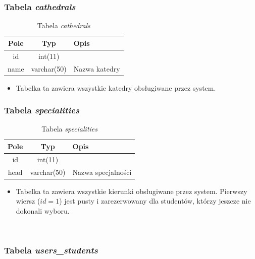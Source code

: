 \documentclass[a4paper,12pt,oneside]{report}
\begin{document}
\subsubsection{Tabela \emph{cathedrals}}
\label{subsub:cathedrals}

\begin{table}[h]
  \centering
  \begin{tabular}{|c|c|l|}\hline
  Pole & Typ & Opis \\\hline
  id              & int(11)      & \\
  name & varchar(50) & Nazwa katedry \\\hline
  \end{tabular}
  \caption{Tabela \emph{cathedrals}\label{tab:cathedrals}}
\end{table}

\begin{itemize}
  \item Tabelka ta zawiera wszystkie katedry obsługiwane przez system.
\end{itemize}

\subsubsection{Tabela \emph{specialities}}
\label{subsub:specialities}

\begin{table}[h]
  \centering
  \begin{tabular}{|c|c|l|}\hline
  Pole & Typ & Opis \\\hline
  id              & int(11)      & \\
  head & varchar(50) & Nazwa specjalności \\\hline
  \end{tabular}
  \caption{Tabela \emph{specialities}\label{tab:specialities}}
\end{table}

\begin{itemize}
  \item Tabelka ta zawiera wszystkie kierunki obsługiwane przez system. Pierwszy wiersz ($id = 1$) jest pusty i zarezerwowany dla studentów, którzy jeszcze nie dokonali wyboru.
\end{itemize}

~\newline

\subsubsection{Tabela \emph{users\_students}}
\label{subsub:users_students}
\end{document}

